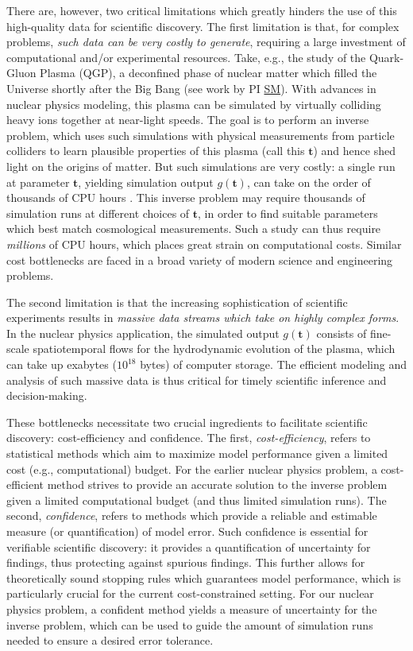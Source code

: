 \documentclass[11pt]{NSFamsart}
\newcommand{\cmtS}[1]{{\color{blue}{(Simon: #1)}}}
\newcommand{\SM}{\hyperlink{SMlink}{SM}\xspace}
\newcommand{\bt}{{\boldsymbol{t}}}
\begin{document}
There are, however, two critical limitations which greatly hinders the use of this high-quality data for scientific discovery. The first limitation is that, for complex problems, \textit{such data can be very costly to generate}, requiring a large investment of computational and/or experimental resources. Take, e.g., the study of the Quark-Gluon Plasma (QGP), a deconfined phase of nuclear matter which filled the Universe shortly after the Big Bang (see work by PI \SM \cite{everett2021multisystem,everett2021phenomenological,liyanage2022efficient,ji2021graphical}). With advances in nuclear physics modeling, this plasma can be simulated by virtually colliding heavy ions together at near-light speeds. The goal is to perform an {inverse problem}, which uses such simulations with physical measurements from particle colliders to learn plausible properties of this plasma (call this $\bt$) and hence shed light on the origins of matter. But such simulations are very costly: a single run at parameter $\bt$, yielding simulation output $g(\bt)$, can take on the order of {thousands} of CPU hours \citep{everett2021multisystem}. This inverse problem may require {thousands} of simulation runs at different choices of $\bt$, in order to find suitable parameters which best match cosmological measurements. Such a study can thus require \textit{millions} of CPU hours, which places great strain on computational costs. Similar cost bottlenecks are faced in a broad variety of modern science and engineering problems. 

The second limitation is that the increasing sophistication of scientific experiments results in \textit{massive data streams which take on highly complex forms}. In the nuclear physics application, the simulated output $g(\bt)$ consists of fine-scale spatiotemporal flows for the hydrodynamic evolution of the plasma, which can take up exabytes ($10^{18}$ bytes) of computer storage. The efficient modeling and analysis of such massive data is thus critical for timely scientific inference and decision-making. \cmtS{UAV application}

These bottlenecks necessitate two crucial ingredients to facilitate scientific discovery: cost-efficiency and confidence. The first, \textit{cost-efficiency}, refers to statistical methods which aim to maximize model performance given a limited cost (e.g., computational) budget. For the earlier nuclear physics problem, a cost-efficient method strives to provide an accurate solution to the inverse problem given a limited computational budget (and thus limited simulation runs). The second, \textit{confidence}, refers to methods which provide a reliable and estimable measure (or quantification) of model error. Such confidence is essential for verifiable scientific discovery: it provides a quantification of uncertainty for findings, thus protecting against spurious findings. This further allows for theoretically sound stopping rules which guarantees model performance, which is particularly crucial for the current cost-constrained setting. For our nuclear physics problem, a confident method yields a measure of uncertainty for the inverse problem, which can be used to guide the amount of simulation runs needed to ensure a desired error tolerance.
\end{document}
